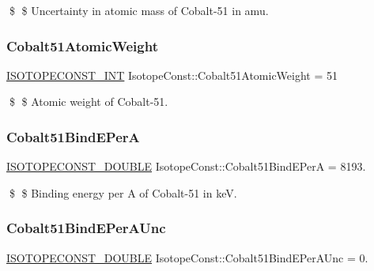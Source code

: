 \$ \$ Uncertainty in atomic mass of Cobalt-\/51 in amu. \mbox{\label{group___isotope_const-_cobalt-_co51_ga7adb200f1a6c0879c343b396afc9298b}} 
\subsubsection{\texorpdfstring{Cobalt51\+Atomic\+Weight}{Cobalt51AtomicWeight}}
{\footnotesize\ttfamily \mbox{\hyperlink{group___isotope_const-_macros_ga5f18360b3e99483a35c32d789e62621c}{I\+S\+O\+T\+O\+P\+E\+C\+O\+N\+S\+T\+\_\+\+I\+NT}} Isotope\+Const\+::\+Cobalt51\+Atomic\+Weight = 51}

\$ \$ Atomic weight of Cobalt-\/51. \mbox{\label{group___isotope_const-_cobalt-_co51_ga509481e613dddfd3870ee50b931a49bd}} 
\subsubsection{\texorpdfstring{Cobalt51\+Bind\+E\+PerA}{Cobalt51BindEPerA}}
{\footnotesize\ttfamily \mbox{\hyperlink{group___isotope_const-_macros_ga8f45a7272ce02c0b4c65c44636ed719a}{I\+S\+O\+T\+O\+P\+E\+C\+O\+N\+S\+T\+\_\+\+D\+O\+U\+B\+LE}} Isotope\+Const\+::\+Cobalt51\+Bind\+E\+PerA = 8193.}

\$ \$ Binding energy per A of Cobalt-\/51 in keV. \mbox{\label{group___isotope_const-_cobalt-_co51_gaa95460a8734d42f07791f9c78b619440}} 
\subsubsection{\texorpdfstring{Cobalt51\+Bind\+E\+Per\+A\+Unc}{Cobalt51BindEPerAUnc}}
{\footnotesize\ttfamily \mbox{\hyperlink{group___isotope_const-_macros_ga8f45a7272ce02c0b4c65c44636ed719a}{I\+S\+O\+T\+O\+P\+E\+C\+O\+N\+S\+T\+\_\+\+D\+O\+U\+B\+LE}} Isotope\+Const\+::\+Cobalt51\+Bind\+E\+Per\+A\+Unc = 0.}

